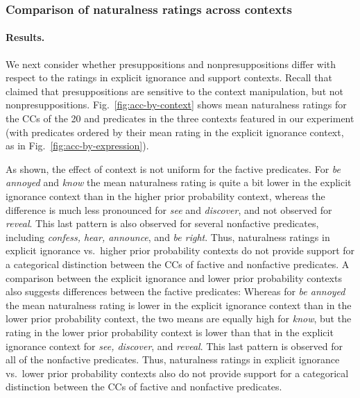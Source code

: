 \documentclass[11pt,fleqn]{article}
\newcommand{\6}{\mbox{$[\hspace*{-.6mm}[$}}
\newcommand{\9}{\mbox{$]\hspace*{-.6mm}]$}}
\begin{document}
\color{black}

\subsubsection{Comparison of naturalness ratings across contexts}\label{s:analysis2}

\paragraph{Results.} We next consider whether presuppositions and nonpresuppositions differ with respect to the ratings in explicit ignorance and support contexts. Recall that \citealt{mandelkern-etal2020} claimed that presuppositions are sensitive to the context manipulation, but not nonpresuppositions. Fig.~\ref{fig:acc-by-context} shows mean naturalness ratings for the CCs of the 20  and  predicates in the three contexts featured in our experiment (with predicates ordered by their mean rating in the explicit ignorance context, as in Fig.~\ref{fig:acc-by-expression}).

As shown, the effect of context is not uniform for the factive predicates. For {\em be annoyed} and {\em know} the mean naturalness rating is quite a bit lower in the explicit ignorance context than in the higher prior probability context, whereas the difference is much less pronounced for {\em see} and {\em discover}, and not observed for {\em reveal}. This last pattern is also observed for several nonfactive predicates, including {\em confess, hear, announce}, and {\em be right}. Thus, naturalness ratings in explicit ignorance vs.\ higher prior probability contexts do not provide support for a categorical distinction between the CCs of factive and nonfactive predicates. A comparison between the explicit ignorance and lower prior probability contexts also suggests differences between the factive predicates: Whereas for {\em be annoyed} the mean naturalness rating is lower in the explicit ignorance context than in the lower prior probability context, the two means are equally high for {\em know}, but the rating in the lower prior probability context is lower than that in the explicit ignorance context for {\em see, discover}, and {\em reveal}. This last pattern is observed for all of the nonfactive predicates. Thus, naturalness ratings in explicit ignorance vs.\ lower prior probability contexts also do not provide support for a categorical distinction between the CCs of factive and nonfactive predicates. 
\end{document}

